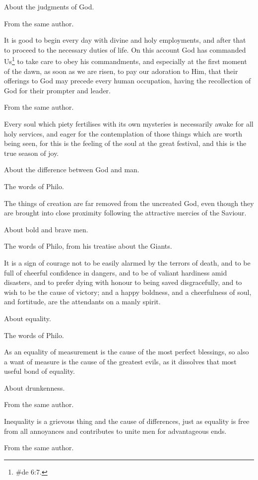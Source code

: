 About the judgments of God.

From the same author.

It is good to begin every day with divine and holy employments, and after that to proceed to the
necessary duties of life. On this account God has commanded Us\footnote{\#de 6:7.} to take care to
obey his commandments, and especially at the first moment of the dawn, as soon as we are risen,
to pay our adoration to Him, that their offerings to God may precede every human occupation,
having the recollection of God for their prompter and leader.

From the same author.

Every soul which piety fertilises with its own mysteries is necessarily awake for all holy services,
and eager for the contemplation of those things which are worth being seen, for this is the feeling
of the soul at the great festival, and this is the true season of joy.

About the difference between God and man.

The words of Philo.

The things of creation are far removed from the uncreated God, even though they are brought into
close proximity following the attractive mercies of the Saviour.

About bold and brave men.

The words of Philo, from his treatise about the Giants.

It is a sign of courage not to be easily alarmed by the terrors of death, and to be full of cheerful
confidence in dangers, and to be of valiant hardiness amid disasters, and to prefer dying with
honour to being saved disgracefully, and to wish to be the cause of victory; and a happy boldness,
and a cheerfulness of soul, and fortitude, are the attendants on a manly spirit.

About equality.

The words of Philo.

As an equality of measurement is the cause of the most perfect blessings, so also a want of
measure is the cause of the greatest evils, as it dissolves that most useful bond of equality.

About drunkenness.

From the same author.

Inequality is a grievous thing and the cause of differences, just as equality is free from all
annoyances and contributes to unite men for advantageous ends.

From the same author.

